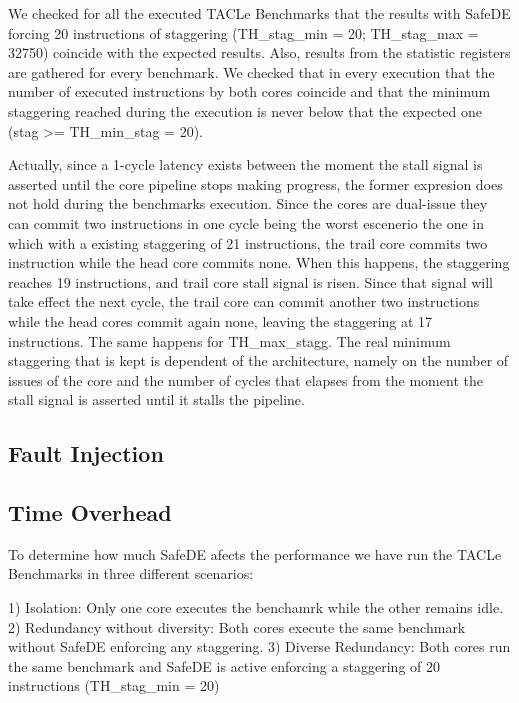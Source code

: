 We checked for all the executed TACLe Benchmarks that the results with SafeDE forcing 20 instructions of staggering (TH\_stag\_min = 20; TH\_stag\_max = 32750) coincide with the expected results. Also, results from the statistic registers are gathered for every benchmark. We checked that in every execution that the number of executed instructions by both cores coincide and that the minimum staggering reached during the execution is never below that the expected one (stag >= TH\_min\_stag = 20). 

Actually, since a 1-cycle latency exists between the moment the stall signal is asserted until the core pipeline stops making progress, the former expresion does not hold during the benchmarks execution. Since the cores are dual-issue they can commit two instructions in one cycle being the worst escenerio the one in which with a existing staggering of 21 instructions, the trail core commits two instruction while the head core commits none. When this happens, the staggering reaches 19 instructions, and trail core stall signal is risen. Since that signal will take effect the next cycle, the trail core can commit another two instructions while the head cores commit again none, leaving the staggering at 17 instructions. The same happens for TH\_max\_stagg. The real minimum staggering that is kept is dependent of the architecture, namely on the number of issues of the core and the number of cycles that elapses from the moment the stall signal is asserted until it stalls the pipeline.  


\subsection{Fault Injection}


\subsection{Time Overhead}

To determine how much SafeDE afects the performance we have run the TACLe Benchmarks in three different scenarios:

1) Isolation: Only one core executes the benchamrk while the other remains idle.
2) Redundancy without diversity: Both cores execute the same benchmark without SafeDE enforcing any staggering. 
3) Diverse Redundancy: Both cores run the same benchmark and SafeDE is active enforcing a staggering of 20 instructions (TH\_stag\_min = 20)

